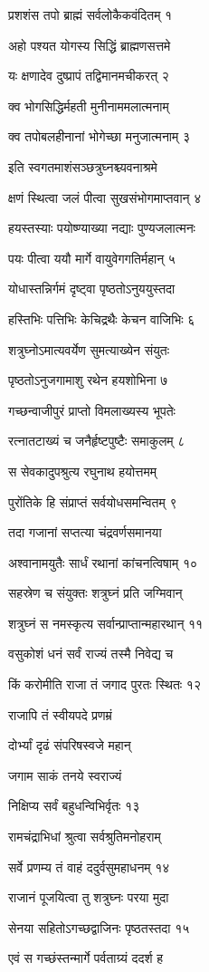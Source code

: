 प्रशशंस तपो ब्राह्मं सर्वलोकैकवंदितम् १

अहो पश्यत योगस्य सिद्धिं ब्राह्मणसत्तमे

यः क्षणादेव दुष्प्रापं तद्विमानमचीकरत् २

क्व भोगसिद्धिर्महती मुनीनाममलात्मनाम्

क्व तपोबलहीनानां भोगेच्छा मनुजात्मनाम् ३

इति स्वगतमाशंसञ्छत्रुघ्नश्च्यवनाश्रमे

क्षणं स्थित्वा जलं पीत्वा सुखसंभोगमाप्तवान् ४

हयस्तस्याः पयोष्ण्याख्या नद्याः पुण्यजलात्मनः

पयः पीत्वा ययौ मार्गे वायुवेगगतिर्महान् ५

योधास्तन्निर्गमं दृष्ट्वा पृष्ठतोऽनुययुस्तदा

हस्तिभिः पत्तिभिः केचिद्रथैः केचन वाजिभिः ६

शत्रुघ्नोऽमात्यवर्येण सुमत्याख्येन संयुतः

पृष्ठतोऽनुजगामाशु रथेन हयशोभिना ७

गच्छन्वाजीपुरं प्राप्तो विमलाख्यस्य भूपतेः

रत्नातटाख्यं च जनैर्हृष्टपुष्टैः समाकुलम् ८

स सेवकादुपश्रुत्य रघुनाथ हयोत्तमम्

पुरोंतिके हि संप्राप्तं सर्वयोधसमन्वितम् ९

तदा गजानां सप्तत्या चंद्रवर्णसमानया

अश्वानामयुतैः सार्धं रथानां कांचनत्विषाम् १०

सहस्रेण च संयुक्तः शत्रुघ्नं प्रति जग्मिवान्

शत्रुघ्नं स नमस्कृत्य सर्वान्प्राप्तान्महारथान् ११

वसुकोशं धनं सर्वं राज्यं तस्मै निवेद्य च

किं करोमीति राजा तं जगाद पुरतः स्थितः १२

राजापि तं स्वीयपदे प्रणम्रं

दोर्भ्यां दृढं संपरिषस्वजे महान्

जगाम साकं तनये स्वराज्यं

निक्षिप्य सर्वं बहुधन्विभिर्वृतः १३

रामचंद्राभिधां श्रुत्वा सर्वश्रुतिमनोहराम्

सर्वे प्रणम्य तं वाहं ददुर्वसुमहाधनम् १४

राजानं पूजयित्वा तु शत्रुघ्नः परया मुदा

सेनया सहितोऽगच्छद्वाजिनः पृष्ठतस्तदा १५

एवं स गच्छंस्तन्मार्गे पर्वताग्र्यं ददर्श ह

